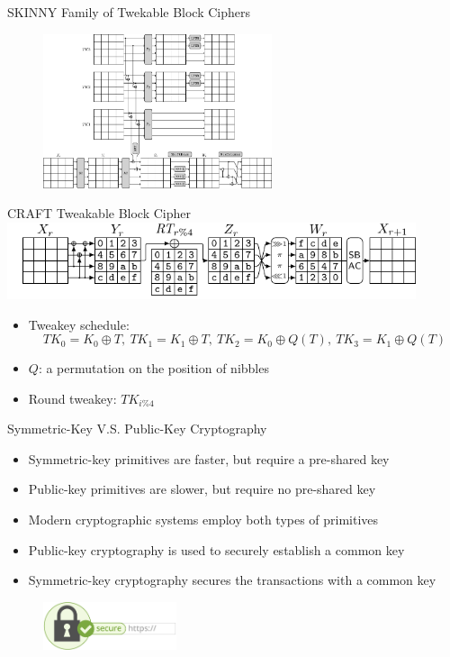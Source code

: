 \documentclass[table,aspectratio=169]{beamer}
\newcommand{\cipher}[1]{\textsc{#1}}
\begin{document}
\begin{frame}{\cipher{SKINNY} Family of Twekable Block Ciphers \cite{skinny}}
\begin{figure}
\centering
\includegraphics[width=0.6\textwidth]{./figures/skinny_round_function_complete.pdf}
\end{figure}
\end{frame}

\begin{frame}{\cipher{CRAFT} Tweakable Block Cipher\cite{tosc_BeierleLMR19}}
\centering
\includegraphics[width=0.9\textwidth]{./figures/craft_round_function.pdf}
\begin{itemize}
  \item Tweakey schedule:
  \[TK_{0} = K_{0} \oplus T, ~ TK_{1} = K_{1} \oplus T,~ TK_{2} = K_{0} \oplus Q(T), ~ TK_{3} = K_{1} \oplus Q(T)\]
  \item $Q$: a permutation on the position of nibbles
  \item Round tweakey: $TK_{i\% 4}$
\end{itemize}
\end{frame}

\begin{frame}{Symmetric-Key V.S. Public-Key Cryptography}
\begin{itemize}
  \item Symmetric-key primitives are faster, but require a pre-shared key
  \item Public-key primitives are slower, but require no pre-shared key
  \item Modern cryptographic systems employ both types of primitives
  \item Public-key cryptography is used to securely establish a common key
  \item Symmetric-key cryptography secures the transactions with a common key
\end{itemize}
\begin{figure}
\centering
\includegraphics[width=0.35\textwidth]{./figures/tls.png}
\end{figure}
\end{frame}
\end{document}

